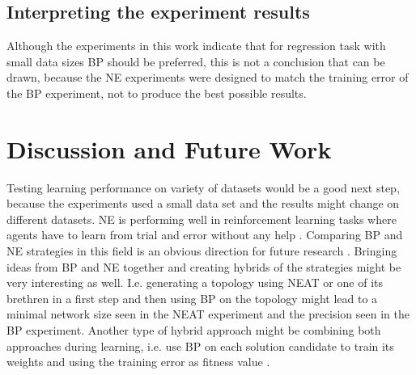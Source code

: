 \documentclass{llncs}
\begin{document}
%
\subsection{Interpreting the experiment results}
  Although the experiments in this work indicate that for regression task with small data sizes BP should be preferred, this is not a conclusion that can be drawn, because the NE experiments were designed to match the training error of the BP experiment, not to produce the best possible results. 
%
%
\section{Discussion and Future Work}
%
Testing learning performance on variety of datasets would be a good next step, because the experiments used a small data set and the results might change on different datasets. NE is performing well in reinforcement learning tasks where agents have to learn from trial and error without any help \cite{Stanley.2019}. Comparing BP and NE strategies in this field is an obvious direction for future research \cite{Salimans.11.03.2017}.  
\newline
Bringing ideas from BP and NE together and creating hybrids of the strategies might be very interesting as well. I.e. generating a topology using NEAT or one of its brethren in a first step and then using BP on the topology might lead to a minimal network size seen in the NEAT experiment and the precision seen in the BP experiment. Another type of hybrid approach might be combining both approaches during learning, i.e. use BP on each solution candidate to train its weights and using the training error as fitness value \cite{Desell.16.03.2017}. 
%
%
%
%






\end{document}
